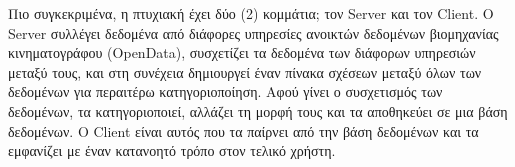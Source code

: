 Πιο συγκεκριμένα, η πτυχιακή έχει δύο (2) κομμάτια; τον Server και τον Client. O Server συλλέγει δεδομένα από διάφορες υπηρεσίες ανοικτών δεδομένων βιομηχανίας κινηματογράφου (OpenData), συσχετίζει τα δεδομένα των διάφορων υπηρεσιών μεταξύ τους, και στη συνέχεια δημιουργεί έναν πίνακα σχέσεων μεταξύ όλων των δεδομένων για περαιτέρω κατηγοριοποίηση. Αφού γίνει ο συσχετισμός των δεδομένων, τα κατηγοριοποιεί, αλλάζει τη μορφή τους και τα αποθηκεύει σε μια βάση δεδομένων. Ο Client είναι αυτός που τα παίρνει από την βάση δεδομένων και τα εμφανίζει με έναν κατανοητό τρόπο στον τελικό χρήστη.


